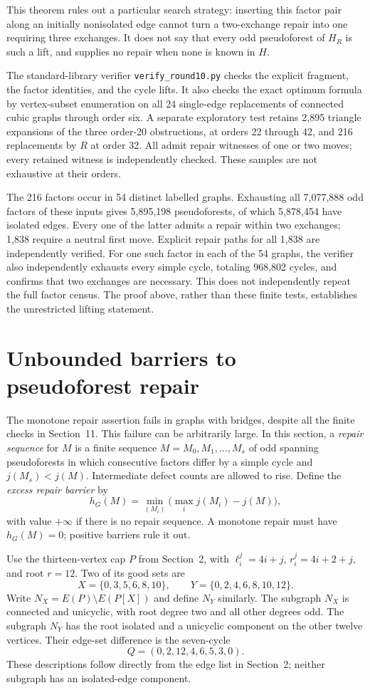 \documentclass[11pt]{article}
\begin{document}
This theorem rules out a particular search strategy: inserting
this factor pair along an initially nonisolated edge cannot turn
a two-exchange repair into one requiring three exchanges. It
does not say that every odd pseudoforest of $H_R$ is such a lift,
and supplies no repair when none is known in $H$.

The standard-library verifier \texttt{verify\_round10.py} checks
the explicit fragment, the factor identities, and the cycle lifts.
It also checks the exact optimum formula by vertex-subset
enumeration on all 24 single-edge replacements of connected
cubic graphs through order six. A separate exploratory test
retains 2,895 triangle expansions of the three order-20
obstructions, at orders 22 through 42, and 216 replacements by
$R$ at order 32. All admit repair witnesses of one or two moves;
every retained witness is independently checked. These samples
are not exhaustive at their orders.

The 216 factors occur in 54 distinct labelled graphs. Exhausting
all 7,077,888 odd factors of these inputs gives 5,895,198
pseudoforests, of which 5,878,454 have isolated edges. Every one
of the latter admits a repair within two exchanges; 1,838 require
a neutral first move. Explicit repair paths for all 1,838 are
independently verified. For one such factor in each of the 54
graphs, the verifier also independently exhausts every simple
cycle, totaling 968,802 cycles, and confirms that two exchanges
are necessary. This does not independently repeat the full factor
census. The proof above, rather than these finite tests,
establishes the unrestricted lifting statement.

\section{Unbounded barriers to pseudoforest repair}
The monotone repair assertion fails in graphs with bridges, despite
all the finite checks in Section~11. This failure can be arbitrarily
large. In this section, a \emph{repair sequence} for $M$ is a finite
sequence $M=M_0,M_1,\ldots,M_s$ of odd spanning pseudoforests in
which consecutive factors differ by a simple cycle and
$j(M_s)<j(M)$. Intermediate defect counts are allowed to rise.
Define the \emph{excess repair barrier} by
\[
 h_G(M)=\min_{(M_i)}\bigl(\max_i j(M_i)-j(M)\bigr),
\]
with value $+\infty$ if there is no repair sequence. A monotone
repair must have $h_G(M)=0$; positive barriers rule it out.

Use the thirteen-vertex cap $P$ from Section~2, with
$\ell_i^j=4i+j$, $r_i^j=4i+2+j$, and root $r=12$.
Two of its good sets are
\[
 X=\{0,3,5,6,8,10\},\qquad
 Y=\{0,2,4,6,8,10,12\}.
\]
Write $N_X=E(P)\setminus E(P[X])$ and define $N_Y$ similarly.
The subgraph $N_X$ is connected and unicyclic, with root degree
two and all other degrees odd. The subgraph $N_Y$ has the root
isolated and a unicyclic component on the other twelve vertices.
Their edge-set difference is the seven-cycle
\begin{equation}\label{eq:cap-switch}
 Q=(0,2,12,4,6,5,3,0).
\end{equation}
These descriptions follow directly from the edge list in Section~2;
neither subgraph has an isolated-edge component.
\end{document}
